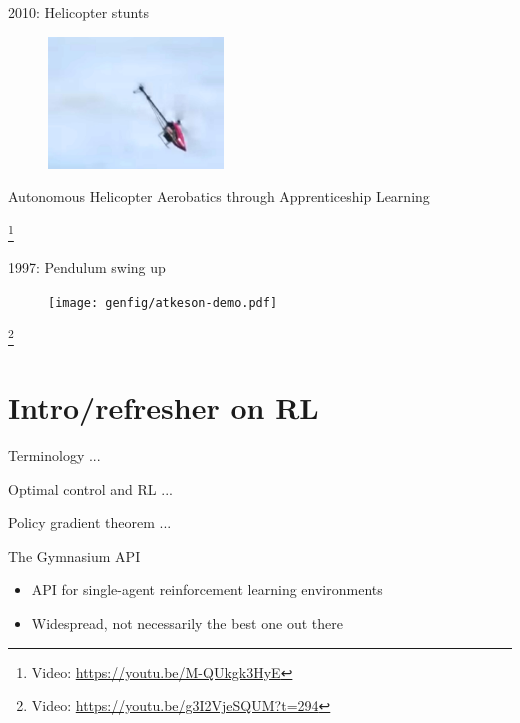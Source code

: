 \documentclass[9pt, aspectratio=169]{beamer}
\newcommand\blfootnote[1]{%
  \begingroup
  \renewcommand\thefootnote{}%
  \footnote{#1}%
  \addtocounter{footnote}{-1}%
  \endgroup
}
\begin{document}
\begin{frame}{2010: Helicopter stunts}
    \vspace{1.5em}
    \begin{figure}
        \includegraphics[height=3.5cm]{figures/helicopter-stunts.jpg}
    \end{figure}
    \begin{center}
        Autonomous Helicopter Aerobatics through Apprenticeship Learning~\cite{abbeel2010}
    \end{center}
    \blfootnote{
        Video: \url{https://youtu.be/M-QUkgk3HyE}
    }
\end{frame}

\begin{frame}{1997: Pendulum swing up~\cite{atkeson1997}}
    \vspace{1.5em}
    \begin{figure}
        \texttt{[image: genfig/atkeson-demo.pdf]}
    \end{figure}
    \blfootnote{
        Video: \url{https://youtu.be/g3I2VjeSQUM?t=294}
    }
\end{frame}


\section*{Intro/refresher on RL}

\begin{frame}{Terminology}
    ...
\end{frame}

\begin{frame}{Optimal control and RL}
    ...
\end{frame}

\begin{frame}{Policy gradient theorem}
    ...
\end{frame}

\begin{frame}{The Gymnasium API}
    \begin{itemize}
        \item API for single-agent reinforcement learning environments
        \item Widespread, not necessarily the best one out there
    \end{itemize}
\end{frame}
\end{document}
